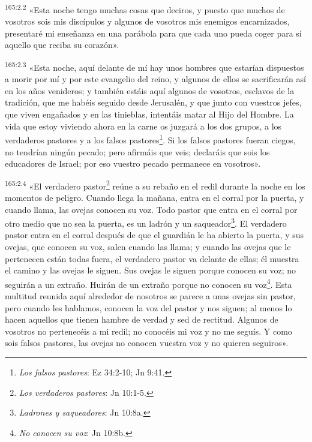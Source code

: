 \par
\textsuperscript{165:2.2} «Esta noche tengo muchas cosas que deciros, y puesto que muchos de vosotros sois mis discípulos y algunos de vosotros mis enemigos encarnizados, presentaré mi enseñanza en una parábola para que cada uno pueda coger para sí aquello que reciba su corazón».

\par
\textsuperscript{165:2.3} «Esta noche, aquí delante de mí hay unos hombres que estarían dispuestos a morir por mí y por este evangelio del reino, y algunos de ellos se sacrificarán así en los años venideros; y también estáis aquí algunos de vosotros, esclavos de la tradición, que me habéis seguido desde Jerusalén, y que junto con vuestros jefes, que viven engañados y en las tinieblas, intentáis matar al Hijo del Hombre. La vida que estoy viviendo ahora en la carne os juzgará a los dos grupos, a los verdaderos pastores y a los falsos pastores\footnote{\textit{Los falsos pastores}: Ez 34:2-10; Jn 9:41.}. Si los falsos pastores fueran ciegos, no tendrían ningún pecado; pero afirmáis que veis; declaráis que sois los educadores de Israel; por eso vuestro pecado permanece en vosotros».

\par
\textsuperscript{165:2.4} «El verdadero pastor\footnote{\textit{Los verdaderos pastores}: Jn 10:1-5.} reúne a su rebaño en el redil durante la noche en los momentos de peligro. Cuando llega la mañana, entra en el corral por la puerta, y cuando llama, las ovejas conocen su voz. Todo pastor que entra en el corral por otro medio que no sea la puerta, es un ladrón y un saqueador\footnote{\textit{Ladrones y saqueadores}: Jn 10:8a.}. El verdadero pastor entra en el corral después de que el guardián le ha abierto la puerta, y sus ovejas, que conocen su voz, salen cuando las llama; y cuando las ovejas que le pertenecen están todas fuera, el verdadero pastor va delante de ellas; él muestra el camino y las ovejas le siguen. Sus ovejas le siguen porque conocen su voz; no seguirán a un extraño. Huirán de un extraño porque no conocen su voz\footnote{\textit{No conocen su voz}: Jn 10:8b.}. Esta multitud reunida aquí alrededor de nosotros se parece a unas ovejas sin pastor, pero cuando les hablamos, conocen la voz del pastor y nos siguen; al menos lo hacen aquellos que tienen hambre de verdad y sed de rectitud. Algunos de vosotros no pertenecéis a mi redil; no conocéis mi voz y no me seguís. Y como sois falsos pastores, las ovejas no conocen vuestra voz y no quieren seguiros».

